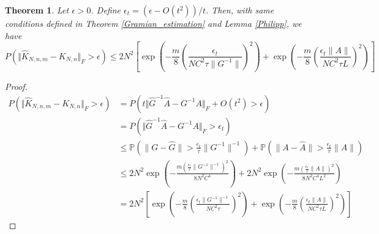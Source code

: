 \documentclass{article}[11]
\newtheorem{theorem}{Theorem}
\begin{document}
	\begin{theorem}
		Let $\epsilon>0$. Define $\epsilon_t = \left(\epsilon - O(t^2)\right)/t$. Then, with same conditions defined in Theorem \ref{Gramian_estimation} and Lemma \ref{Philipp}, we have
		\begin{equation*}
			P\left(\Vert \widehat{K}_{N,n,m} - K_{N,n} \Vert_F > \epsilon \right) \leq 2N^2 \left[ \exp \left( -\frac{m}{8} \left(\frac{\epsilon_t}{N C^2 \tau \|G^{-1}\|}\right)^2 \right) + \exp \left( -\frac{m}{8} \left(\frac{\epsilon_t \|A\|}{N C^2 \tau L}\right)^2 \right) \right]
		\end{equation*}  
	\end{theorem}
	\begin{proof}
		\begin{align*}
			P\left(\Vert \widehat{K}_{N,n,m} - K_{N,n} \Vert_F > \epsilon \right) 
			&= P\left( t\Vert \widehat{G}^{-1} \widehat{A} - G^{-1}A \Vert_F + O(t^2) > \epsilon \right) \\
			&= P\left( \Vert \widehat{G}^{-1} \widehat{A} - G^{-1}A \Vert_F  > \epsilon_t \right) \\
			&\leq \mathbb{P}\left(\|G - \widehat{G}\| > \frac{\epsilon_t}{\tau} \|G^{-1}\|^{-1} \right) + \mathbb{P}\left(\|A - \widehat{A}\| > \frac{\epsilon_t}{\tau} \|A\| \right) \\
			&\leq 2N^2 \exp \left( -\frac{m (\frac{\epsilon_t}{\tau} \|G^{-1}\|^{-1})^2}{8 N^2 C^4} \right) + 2N^2 \exp \left( -\frac{m (\frac{\epsilon_t}{\tau} \|A\|)^2}{8 N^2 C^4 L^2} \right) \\
			&= 2N^2 \left[ \exp \left( -\frac{m}{8} \left(\frac{\epsilon_t \|G^{-1}\|^{-1}}{N C^2 \tau}\right)^2 \right) + \exp \left( -\frac{m}{8} \left(\frac{\epsilon_t \|A\|}{N C^2 \tau L}\right)^2 \right) \right]
		\end{align*}  
	\end{proof}
	
	
	
\end{document}
